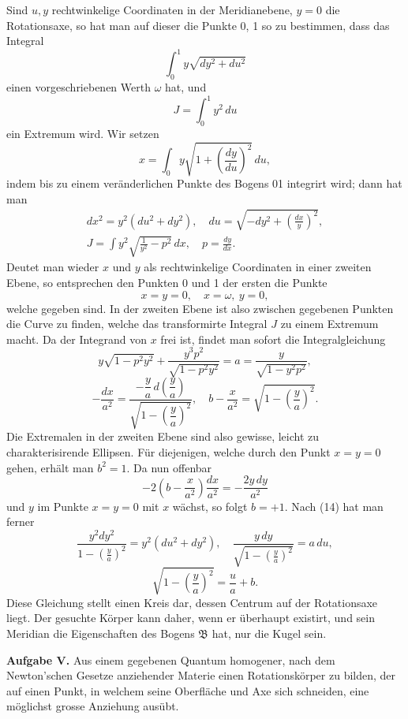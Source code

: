 \documentclass[11pt,a4paper,leqno]{article}
\begin{document}
Sind $u,y$ rechtwinkelige Coordinaten in der Meridianebene, $y=0$ die Rotationsaxe, so hat man auf dieser die Punkte 0, 1 so zu bestimmen, dass das Integral
\[
\int_0^1 y\sqrt{dy^2+du^2}
\]
einen vorgeschriebenen Werth $\omega$ hat, und
\[
J=\int_0^1 y^2\,du
\]
ein Extremum wird. Wir setzen
\[
x=\int_0 y\sqrt{1+\left(\frac{dy}{du}\right)^2}\,du,
\]
indem bis zu einem veränderlichen Punkte des Bogens 01 integrirt wird; dann hat man
\begin{equation}\tag{14}
\begin{gathered}
dx^2=y^2(du^2+dy^2),\quad du=\sqrt{-dy^2+\left(\frac{dx}{y}\right)^2},\\
J=\int y^2\sqrt{\frac{1}{y^2}-p^2}\,dx,
\quad p=\frac{dy}{dx}.
\end{gathered}
\end{equation}
Deutet man wieder $x$ und $y$ als rechtwinkelige Coordinaten in einer zweiten Ebene, so entsprechen den Punkten 0 und 1 der ersten die Punkte
\[
x=y=0,\quad x=\omega,\ y=0,
\]
welche gegeben sind. In der zweiten Ebene ist also zwischen gegebenen Punkten die Curve zu finden, welche das transformirte Integral $J$ zu einem Extremum macht. Da der Integrand von $x$ frei ist, findet man sofort die Integralgleichung
\[
y\sqrt{1-p^2y^2}+\frac{y^3p^2}{\sqrt{1-p^2y^2}}=a=\frac{y}{\sqrt{1-y^2p^2}},
\]
\[
-\frac{dx}{a^2}=\frac{-\dfrac{y}{a}\,d\left(\dfrac{y}{a}\right)}{\sqrt{1-\left(\dfrac{y}{a}\right)^2}},\quad
b-\frac{x}{a^2}=\sqrt{1-\left(\frac{y}{a}\right)^2}.
\]
Die Extremalen in der zweiten Ebene sind also gewisse, leicht zu charakterisirende Ellipsen. Für diejenigen, welche durch den Punkt $x=y=0$ gehen, erhält man $b^2=1$. Da nun offenbar
\[
-2\left(b-\frac{x}{a^2}\right)\frac{dx}{a^2}=-\frac{2y\,dy}{a^2}
\]
und $y$ im Punkte $x=y=0$ mit $x$ wächst, so folgt $b=+1$. Nach (14) hat man ferner
\[
\frac{y^2dy^2}{1-\left(\frac{y}{a}\right)^2}=y^2(du^2+dy^2),\quad
\frac{y\,dy}{\sqrt{1-\left(\frac{y}{a}\right)^2}}=a\,du,
\]
\[
\sqrt{1-\left(\frac{y}{a}\right)^2}=\frac{u}{a}+b.
\]
Diese Gleichung stellt einen Kreis dar, dessen Centrum auf der Rotationsaxe liegt. Der gesuchte Körper kann daher, wenn er überhaupt existirt, und sein Meridian die Eigenschaften des Bogens $\mathfrak{B}$ hat, nur die Kugel sein.

\medskip
\noindent\textbf{Aufgabe V.} Aus einem gegebenen Quantum homogener, nach dem Newton'schen Gesetze anziehender Materie einen Rotationskörper zu bilden, der auf einen Punkt, in welchem seine Oberfläche und Axe sich schneiden, eine möglichst grosse Anziehung ausübt.
\end{document}
